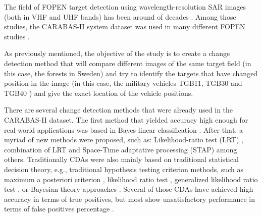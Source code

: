 The field of FOPEN target detection using wavelength-resolution SAR images (both in VHF and UHF bands) has been 
around of decades \cite{ 25,48,79,80}. Among those studies, the CARABAS-II system dataset was used in many different FOPEN studies 
\cite{}. 

As previously mentioned, the objective of the study is to create a change detection method that will compare 
different images of the same target field (in this case, the forests in Sweden) and try to identify the targets that 
have changed position in the image (in this case, the military vehicles TGB11, TGB30 and TGB40 ) and give the exact location of the vehicle positions.


There are several change detection methods that were already used in the CARABAS-II dataset.
The first method that yielded accuracy high enough for real world applications was based in Bayes linear classification \cite{81}.
After that, a myriad of new methods were proposed, such as: Likelihood-ratio test (LRT) \cite{ 61}, combination of LRT and Space-Time 
adaptative processing (STAP) \cite{ 76} among others. Traditionally CDAs were also mainly based on traditional statistical decision theory, e.g., 
traditional hypothesis testing criterion methods, such as maximum a posteriori 
criterion \cite{Book_Kay}, likelihood ratio test \cite{LRT1,LRT2,LRT3}, generalized likelihood ratio test \cite{GLRT1,GLRT2,GLRT3}, 
or Bayesian theory approaches \cite{Bayes1, Bayes2}. Several of those CDAs have achieved high accuracy 
in terms of true positives, but most show unsatisfactory performance in terms of false positives percentage \cite{Carabas, Ricardo,LucasRamos,Chris}.





